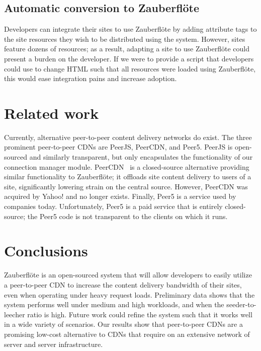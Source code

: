 \documentclass[letterpaper,twocolumn,10pt]{article}
\newcommand{\zbf}{Zauberfl\"{o}te\xspace}
\begin{document}
\subsection{Automatic conversion to \zbf}
Developers can integrate their sites to use \zbf by adding attribute tags to
the site resources they wish to be distributed using the system. However, sites feature
dozens of resources; as a result, adapting a site to use \zbf could present a
burden on the developer. If we were to provide a script that developers could use
to change HTML such that all resources were loaded using \zbf, this would ease
integration pains and increase adoption.

\section{Related work}

Currently, alternative peer-to-peer content delivery networks do exist. The three
prominent peer-to-peer CDNs are PeerJS, PeerCDN, and Peer5. PeerJS is open-sourced
and similarly transparent, but only encapsulates the functionality of our connection manager
module. PeerCDN~\cite{peercdn} is a closed-source alternative providing  similar
functionality to \zbf; it offloads site content delivery to users of a site,
significantly lowering strain on the central source. However, PeerCDN was acquired by
Yahoo! and no longer exists. Finally, Peer5 is a service used by companies today.
Unfortunately, Peer5 is a paid service that is entirely closed-source; the Peer5 code is
not transparent to the clients on which it runs.

\section{Conclusions}

\zbf is an open-sourced system that will allow developers to easily utilize
a peer-to-peer CDN to increase the content delivery bandwidth of their sites,
even when operating under heavy request loads. Preliminary data shows that
the system performs well under medium and high workloads, and when the
seeder-to-leecher ratio is high. Future work could refine the system
such that it works well in a wide variety of scenarios. Our results show that peer-to-peer
CDNs are a promising low-cost alternative to CDNs that require on an extensive
network of server and server infrastructure.



{\footnotesize 
}
\end{document}
